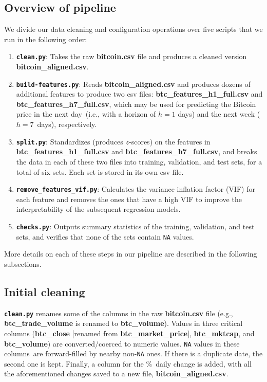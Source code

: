 \documentclass{article}
\begin{document}
\subsection{Overview of pipeline}
We divide our data cleaning and configuration operations over five scripts that we run in the following order:

\begin{enumerate}
    \item \textbf{\texttt{clean.py}}: Takes the raw \textbf{bitcoin.csv} file and produces a cleaned version \textbf{bitcoin\_aligned.csv}.
    \item \textbf{\texttt{build-features.py}}: Reads \textbf{bitcoin\_aligned.csv} and produces dozens of additional features to produce two csv files: \textbf{btc\_features\_h1\_full.csv} and \textbf{btc\_features\_h7\_full.csv}, which may be used for predicting the Bitcoin price in the next day~(i.e., with a horizon of $h=1$ days) and the next week ($h=7$~days), respectively.
    \item \textbf{\texttt{split.py}}: Standardizes (produces $z$-scores) on the features in \textbf{btc\_features\_h1\_full.csv} and \textbf{btc\_features\_h7\_full.csv}, and breaks the data in each of these two files into training, validation, and test sets, for a total of six sets. Each set is stored in its own csv file.
    \item \textbf{\texttt{remove\_features\_vif.py}}: Calculates the variance inflation factor (VIF) for each feature and removes the ones that have a high VIF to improve the interpretability of the subsequent regression models.
    \item \textbf{\texttt{checks.py}}: Outputs summary statistics of the training, validation, and test sets, and verifies that none of the sets contain \texttt{NA} values.
\end{enumerate}

\noindent More details on each of these steps in our pipeline are described in the following subsections.

\subsection{Initial cleaning}
\textbf{\texttt{clean.py}} renames some of the columns in the raw \textbf{bitcoin.csv} file (e.g., \textbf{btc\_trade\_volume} is renamed to \textbf{btc\_volume}). Values in three critical columns (\textbf{btc\_close} [renamed from \textbf{btc\_market\_price}], \textbf{btc\_mktcap}, and \textbf{btc\_volume}) are converted/coerced to numeric values. \texttt{NA} values in these columns~are forward-filled by nearby non-\texttt{NA} ones. If there is a duplicate date, the second one is kept. Finally, a column for the \%~daily change is added, with all the aforementioned changes saved to a new file, \textbf{bitcoin\_aligned.csv}.
\end{document}
